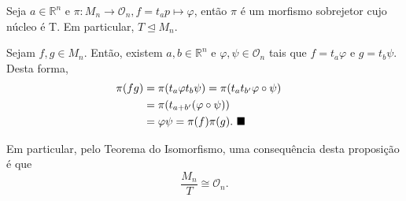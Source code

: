 \documentclass[algebra_notes.tex]{subfiles}
\begin{document}
\begin{prop*}
	Seja $a\in \mathbb{R}^{n}$ e $\pi :M_{n}\rightarrow \mathcal{O}_{n}, f=t_{a}p\mapsto \varphi $, então $\pi $
	é um morfismo sobrejetor cujo núcleo é T. Em particular, $T\trianglelefteq{M_{n}}.$
\end{prop*}
\begin{proof*}
	Sejam $f, g\in M_{n}.$ Então, existem $a, b\in \mathbb{R}^{n}$ e $\varphi , \psi\in \mathcal{O}_{n}$ tais que
	$f=t_{a}\varphi $ e $g=t_{b}\psi.$ Desta forma,
	\begin{align*}
		\pi (fg) & = \pi (t_{a}\varphi t_{b}\psi)=\pi (t_{a}t_{b'}\varphi\circ{\psi}) & \\
		         & =\pi (t_{a+b'}(\varphi\circ{\psi}))                                  \\
		         & =\varphi \psi = \pi (f)\pi (g).\text{ $\blacksquare$}
	\end{align*}
\end{proof*}
Em particular, pelo Teorema do Isomorfismo, uma consequência desta proposição é que
$$
	\frac{M_{n}}{T}\cong{\mathcal{O}_{n}}.
$$
\end{document}
